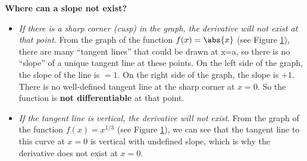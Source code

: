 \noindent \textbf{Where can a slope not exist?}
\begin{itemize}
    \item \emph{If there is a sharp corner (cusp) in the graph, the derivative will not exist at that point}. From the graph of the function $f(x)=\abs{x}$ (see Figure \ref{fig:absANDcuberoot}), there are many “tangent lines” that could be drawn at x=a, so there is no “slope” of a unique tangent line at these points. On the left side of the graph, the slope of the line is $=1$. On the right side of the graph, the slope is $+1$. There is no well-defined tangent line at the sharp corner at $x=0$. So the function is \textbf{not differentiable} at that point.
    \item \emph{If the tangent line is vertical, the derivative will not exist}. From the graph of the function $f(x)=x^{1/3}$ (see Figure  \ref{fig:absANDcuberoot}), we can see that the tangent line to this curve at $x=0$ is vertical with undefined slope, which is why the derivative does not exist at $x=0$. 
\end{itemize}
\vspace{-1cm}
\begin{figure}[H]
    \centering
    \begin{minipage}{0.45\textwidth}
        \begin{center}
         \end{center}
    \end{minipage}
    \hspace{0.02cm}
    \begin{minipage}{0.45\textwidth}
        \begin{center}
         \end{center}
    \end{minipage}
    
    \caption{}
    \label{fig:absANDcuberoot}
\end{figure}
